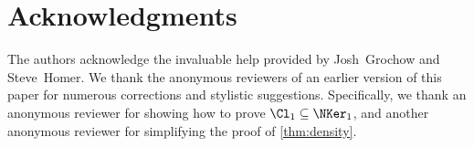 \section{Acknowledgments}

The authors acknowledge the invaluable help provided by Josh~Grochow and Steve~Homer.
We thank the anonymous reviewers of an earlier version of this paper for numerous corrections and stylistic suggestions.
Specifically, we thank an anonymous reviewer for showing how to prove $\Cl_1 \subseteq \NKer_1$, and another anonymous reviewer for simplifying the proof of \autoref{thm:density}.
